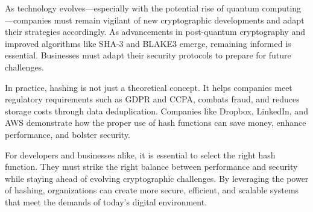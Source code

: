 \documentclass[11pt,a4paper]{article}
\begin{document}
As technology evolves—especially with the potential rise of quantum computing—companies must remain vigilant of new cryptographic developments and adapt their strategies accordingly. As advancements in post-quantum cryptography and improved algorithms like SHA-3 and BLAKE3 emerge, remaining informed is essential. Businesses must adapt their security protocols to prepare for future challenges.

In practice, hashing is not just a theoretical concept. It helps companies meet regulatory requirements such as GDPR and CCPA, combats fraud, and reduces storage costs through data deduplication. Companies like Dropbox, LinkedIn, and AWS demonstrate how the proper use of hash functions can save money, enhance performance, and bolster security.

For developers and businesses alike, it is essential to select the right hash function. They must strike the right balance between performance and security while staying ahead of evolving cryptographic challenges. By leveraging the power of hashing, organizations can create more secure, efficient, and scalable systems that meet the demands of today’s digital environment.





\newpage

\begin{multicols}{2}
    \small
    
    \makeatletter
    \renewcommand\@biblabel[1]{#1.} 
    
\end{multicols}
\end{document}

